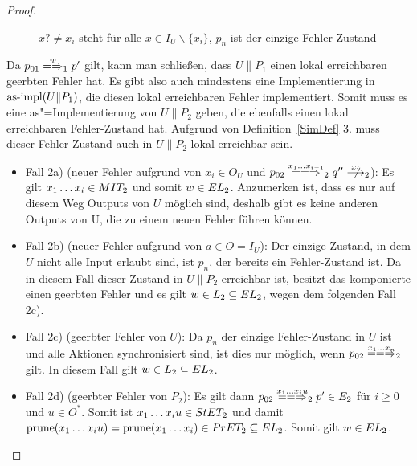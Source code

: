 \begin{proof}
\begin{itemize}
\begin{figure} [h!tbp]
\begin{center}
        \caption{$x?\neq x_i$ steht für alle $x\in I_U\backslash\{x_i\}$, $p_n$
          ist der einzige Fehler-Zustand}
      \label{UmitE}
      \end{center}
      \end{figure}
      Da $p_{01}\weakmay[w]_1p'$ gilt, kann man schließen, dass $U\|P_1$ einen
      lokal erreichbaren geerbten Fehler hat. Es gibt also auch mindestens eine
      Implementierung in $\mathrm{as}\text{-}\mathrm{impl} (U\|P_1)$, die diesen lokal erreichbaren
      Fehler implementiert. Somit muss es eine as"=Implementierung von $U\|P_2$
      geben, die ebenfalls einen lokal erreichbaren Fehler-Zustand hat.
      Aufgrund von Definition~\ref{SimDef} 3. muss dieser Fehler-Zustand auch
      in $U\|P_2$ lokal erreichbar sein.
      \begin{itemize}
        \item Fall 2a) (neuer Fehler aufgrund von $x_i\in O_U$ und $p_{02}
          \lweakmay[x_1\dots x_{i-1}]_2q''\nmust[x_i]_2$): Es gilt $x_1\dots
          x_i\in MIT _2$ und somit $w\in EL_2$. Anzumerken ist, dass es nur
          auf diesem Weg Outputs von $U$ möglich sind, deshalb gibt es keine
          anderen Outputs von U, die zu einem neuen Fehler führen können.
        \item Fall 2b) (neuer Fehler aufgrund von $a\in O=I_U$): Der einzige
          Zustand, in dem $U$ nicht alle Input erlaubt sind, ist $p_n$, der
          bereits ein Fehler-Zustand ist. Da in diesem Fall dieser Zustand in
          $U\|P_2$ erreichbar ist, besitzt das komponierte \MEIO{} einen
          geerbten Fehler und es gilt $w\in L_2\subseteq EL _2$, wegen dem
          folgenden Fall 2c).
        \item Fall 2c) (geerbter Fehler von $U$): Da $p_n$ der einzige
          Fehler-Zustand in $U$ ist und alle Aktionen synchronisiert sind, ist
          dies nur möglich, wenn $p_{02} \lweakmay[x_1\dots x_n]_2$ gilt. In
          diesem Fall gilt $w\in L_2\subseteq EL _2$.
        \item Fall 2d) (geerbter Fehler von $P_2$): Es gilt dann $p_{02}
          \lweakmay[x_1\dots x_iu]_2 p'\in E_2$ für $i\geq 0$ und $u\in O^*$.
          Somit ist $x_1\dots x_iu\in StET _2$ und damit $\mathrm{prune} (x_1\dots
          x_iu) =\mathrm{prune} (x_1\dots x_i)\in PrET _2\subseteq EL _2$. Somit gilt
          $w\in EL _2$.
      \end{itemize}
  \end{itemize}
\end{proof}

